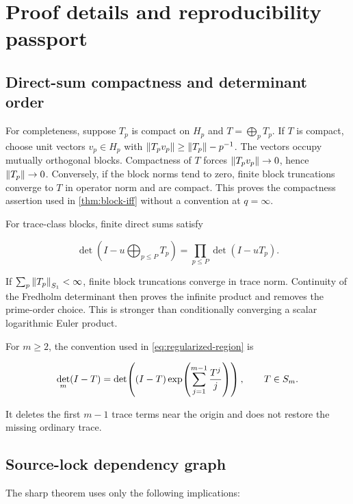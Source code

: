 \section{Proof details and reproducibility passport}
\label{app:details}

\subsection{Direct-sum compactness and determinant order}
\label{app:direct-sum}

For completeness, suppose \(T_p\) is compact on \(H_p\) and
\(T=\bigoplus_pT_p\).  If \(T\) is compact, choose unit vectors \(v_p\in H_p\)
with \(\left\lVert T_pv_p\right\rVert\ge\left\lVert T_p\right\rVert-p^{-1}\).  The vectors occupy mutually
orthogonal blocks.  Compactness of \(T\) forces \(\left\lVert T_pv_p\right\rVert\to0\), hence
\(\left\lVert T_p\right\rVert\to0\).  Conversely, if the block norms tend to zero, finite
block truncations converge to \(T\) in operator norm and are compact.  This
proves the compactness assertion used in \cref{thm:block-iff} without a
convention at \(q=\infty\).

For trace-class blocks, finite direct sums satisfy

\[
 \det\!\left(I-u\bigoplus_{p\le P}T_p\right)
 =\prod_{p\le P}\det(I-uT_p).
\]

If \(\sum_p\left\lVert T_p\right\rVert_{S_{1}}<\infty\), finite block truncations
converge in trace norm.  Continuity of the Fredholm determinant then proves
the infinite product and removes the prime-order choice.  This is stronger
than conditionally converging a scalar logarithmic Euler product.

For \(m\ge2\), the convention used in \cref{eq:regularized-region} is

\[
 \det_m(I-T)=\det\!\left((I-T)
 \exp\!\left(\sum_{j=1}^{m-1}\frac{T^j}{j}\right)\right),
 \qquad T\in S_{m}.
\]

It deletes the first \(m-1\) trace terms near the origin and does not restore
the missing ordinary trace.

\subsection{Source-lock dependency graph}
\label{app:source-lock}

The sharp theorem uses only the following implications:

